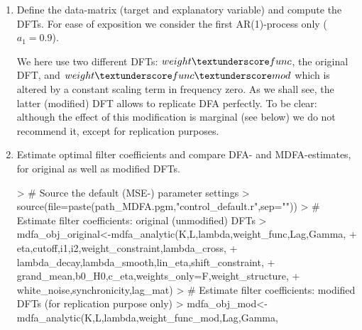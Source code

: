 \documentclass[a4paper]{book}
\begin{document}
\begin{enumerate}
\item \label{ex_rep_dfa_1}Define the data-matrix (target and explanatory variable) and compute the DFTs. For ease of exposition we consider the first AR(1)-process only ($a_1=0.9$).
\begin{Schunk}
\end{Schunk}
We here use two different DFTs: $weight\textunderscore func$, the original DFT, and $weight\textunderscore func\textunderscore mod$ which is altered by a constant scaling term in frequency zero. As we shall see, the latter (modified) DFT allows to replicate DFA perfectly. To be clear: although the effect of this modification is marginal (see below) we do not recommend it, except for replication purposes. 
\item Estimate optimal filter coefficients and compare DFA- and MDFA-estimates, for original as well as modified DFTs.
\begin{Schunk}
\begin{Sinput}
> # Source the default (MSE-) parameter settings
> source(file=paste(path_MDFA.pgm,"control_default.r",sep=""))
> # Estimate filter coefficients: original (unmodified) DFTs
> mdfa_obj_original<-mdfa_analytic(K,L,lambda,weight_func,Lag,Gamma,
+                     eta,cutoff,i1,i2,weight_constraint,lambda_cross,
+                     lambda_decay,lambda_smooth,lin_eta,shift_constraint,
+                     grand_mean,b0_H0,c_eta,weights_only=F,weight_structure,
+                     white_noise,synchronicity,lag_mat)
> # Estimate filter coefficients: modified DFTs (for replication purpose only)
> mdfa_obj_mod<-mdfa_analytic(K,L,lambda,weight_func_mod,Lag,Gamma,

\end{Sinput}
\end{Schunk}
\end{enumerate}
\end{document}
